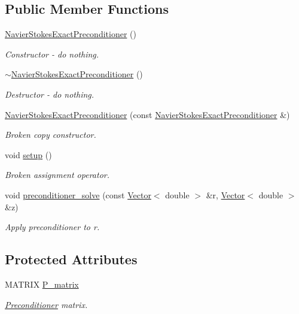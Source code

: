 \subsection*{Public Member Functions}
\begin{DoxyCompactItemize}
\item 
\hyperlink{classoomph_1_1NavierStokesExactPreconditioner_ad94bf61083255a8a9304a6dfb88a2ca2}{Navier\+Stokes\+Exact\+Preconditioner} ()
\begin{DoxyCompactList}\small\item\em Constructor -\/ do nothing. \end{DoxyCompactList}\item 
\hyperlink{classoomph_1_1NavierStokesExactPreconditioner_a8d47c42999aa6d0e2e01e8397f380ad5}{$\sim$\+Navier\+Stokes\+Exact\+Preconditioner} ()
\begin{DoxyCompactList}\small\item\em Destructor -\/ do nothing. \end{DoxyCompactList}\item 
\hyperlink{classoomph_1_1NavierStokesExactPreconditioner_ad7975a821efddb4cd6566f0c990142e3}{Navier\+Stokes\+Exact\+Preconditioner} (const \hyperlink{classoomph_1_1NavierStokesExactPreconditioner}{Navier\+Stokes\+Exact\+Preconditioner} \&)
\begin{DoxyCompactList}\small\item\em Broken copy constructor. \end{DoxyCompactList}\item 
void \hyperlink{classoomph_1_1NavierStokesExactPreconditioner_a2879372ba29ceaf57e68f711cd4113aa}{setup} ()
\begin{DoxyCompactList}\small\item\em Broken assignment operator. \end{DoxyCompactList}\item 
void \hyperlink{classoomph_1_1NavierStokesExactPreconditioner_a6694cc09bcdaefcb55de5700e39164ff}{preconditioner\+\_\+solve} (const \hyperlink{classoomph_1_1Vector}{Vector}$<$ double $>$ \&r, \hyperlink{classoomph_1_1Vector}{Vector}$<$ double $>$ \&z)
\begin{DoxyCompactList}\small\item\em Apply preconditioner to r. \end{DoxyCompactList}\end{DoxyCompactItemize}
\subsection*{Protected Attributes}
\begin{DoxyCompactItemize}
\item 
M\+A\+T\+R\+IX \hyperlink{classoomph_1_1NavierStokesExactPreconditioner_ace31a9a18f713467aba137d64dbf764a}{P\+\_\+matrix}
\begin{DoxyCompactList}\small\item\em \hyperlink{classoomph_1_1Preconditioner}{Preconditioner} matrix. \end{DoxyCompactList}\end{DoxyCompactItemize}
